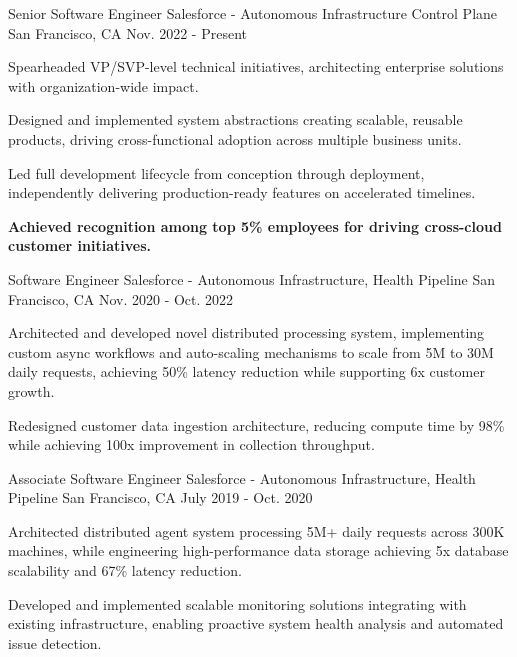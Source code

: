 \begin{cventries}
  \cventry
    {Senior Software Engineer}
    {Salesforce - Autonomous Infrastructure Control Plane}
    {San Francisco, CA}
    {Nov. 2022 - Present}
    {
      \begin{cvitems}
        \item {Spearheaded VP/SVP-level technical initiatives, architecting enterprise solutions with organization-wide impact.}
        \item {Designed and implemented system abstractions creating scalable, reusable products, driving cross-functional adoption across multiple business units.}
        \item {Led full development lifecycle from conception through deployment, independently delivering production-ready features on accelerated timelines.}
        \item {\textbf{Achieved recognition among top 5\% employees for driving cross-cloud customer initiatives.}}
      \end{cvitems}
    }

  \cventry
    {Software Engineer}
    {Salesforce - Autonomous Infrastructure, Health Pipeline}
    {San Francisco, CA}
    {Nov. 2020 - Oct. 2022}
    {
      \begin{cvitems}
        \item {Architected and developed novel distributed processing system, implementing custom async workflows and auto-scaling mechanisms to scale from 5M to 30M daily requests, achieving 50\% latency reduction while supporting 6x customer growth.}
        \item {Redesigned customer data ingestion architecture, reducing compute time by 98\% while achieving 100x improvement in collection throughput.}
      \end{cvitems}
    }

  \cventry
    {Associate Software Engineer}
    {Salesforce - Autonomous Infrastructure, Health Pipeline}
    {San Francisco, CA}
    {July 2019 - Oct. 2020}
    {
      \begin{cvitems}
        \item {Architected distributed agent system processing 5M+ daily requests across 300K machines, while engineering high-performance data storage achieving 5x database scalability and 67\% latency reduction.}
        \item {Developed and implemented scalable monitoring solutions integrating with existing infrastructure, enabling proactive system health analysis and automated issue detection.}
      \end{cvitems}
    }


\end{cventries}
